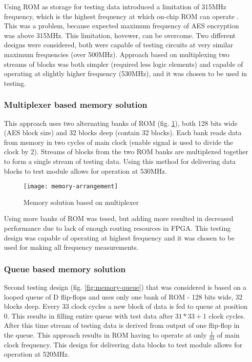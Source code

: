 Using ROM as storage for testing data introduced a limitation of 315MHz frequency, which is the highest frequency at which on-chip ROM can operate \cite[Table 2-1]{altera-vol1} . This was a problem, because expected maximum frequency of AES encryption was above 315MHz. This limitation, hovewer, can be overcome. Two different designs were considered, both were capable of testing circuits at very similar maximum frequencies (over 500MHz). Approach based on multiplexing two streams of blocks was both simpler (required less logic elements) and capable of operating at slightly higher frequency (530MHz), and it was chosen to be used in testing.


\subsubsection{Multiplexer based memory solution}
This approach uses two alternating banks of ROM (fig. \ref{fig:memory-arrangement}), both 128 bits wide (AES block size) and 32 blocks deep (contain 32 blocks). Each bank reads data from memory in two cycles of main clock (enable signal is used to divide the clock by 2). Streams of blocks from the two ROM banks are multiplexed together to form a single stream of testing data. Using this method for delivering data blocks to test module allows for operation at 530MHz. 

\begin{figure}[!h]
\centering
\texttt{[image: memory-arrangement]}
\caption{Memory solution based on multiplexer}
\label{fig:memory-arrangement}
\end{figure}

Using more banks of ROM was tesed, but adding more resulted in decreased performance due to lack of enough routing resources in FPGA. This testing design was capable of operating at highest frequency and it was chosen to be used for making all frequency measurements.

\subsubsection{Queue based memory solution}
Second testing design (fig. \ref{fig:memory-queue}) that was considered is based on a looped queue of D flip-flops and uses only one bank of ROM - 128 bits wide, 32 blocks deep. Every 33 clock cycles a new block of data is fed to queue at position 0. This results in filling entire queue with test data after $31 * 33 + 1$ clock cycles. After this time stream of testing data is derived from output of one flip-flop in the queue. This approach results in ROM having to operate at only $\frac{1}{33}$ of main clock frequency. This design for delivering data blocks to test module allows for operation at 520MHz. 

